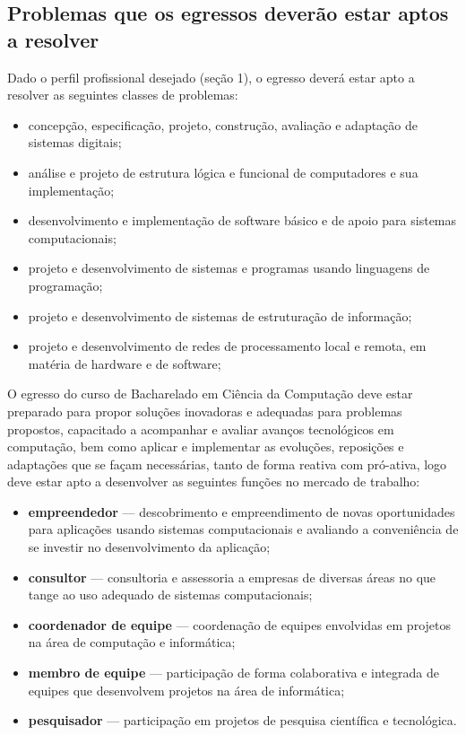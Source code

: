\documentclass[
	12pt,				%
	openright,			%
  oneside,     %
	a4paper,			%
	english,			%
	french,				%
	spanish,			%
	brazil				%
	]{abntex2}
\begin{document}
\subsection{Problemas que os egressos deverão estar aptos a resolver}

Dado o perfil profissional desejado (seção 1), o egresso deverá estar apto a resolver as seguintes classes de problemas: 

\begin{itemize}
  \item concepção, especificação, projeto, construção, avaliação e adaptação de sistemas digitais; 
  \item análise e projeto de estrutura lógica e funcional de computadores e sua
implementação;
  \item desenvolvimento e implementação de software básico e de apoio para
  sistemas computacionais;
  \item projeto e desenvolvimento de sistemas e programas usando linguagens de
  programação;
  \item projeto e desenvolvimento de sistemas de estruturação de informação; 
  \item projeto e desenvolvimento de redes de processamento local e remota, em
  matéria de hardware e de software;
\end{itemize}

O egresso do curso de Bacharelado em Ciência da Computação deve estar
preparado para propor soluções inovadoras e  adequadas para problemas propostos,
capacitado a acompanhar e avaliar avanços  tecnológicos em computação, bem como
aplicar e implementar as evoluções, reposições e adaptações que se façam
necessárias, tanto de forma reativa com pró-ativa, logo deve estar apto a
desenvolver as seguintes funções no mercado de trabalho:

\begin{itemize}
  \item \textbf{empreendedor} --- descobrimento e empreendimento de novas
  oportunidades para aplicações usando sistemas computacionais e avaliando a 
  conveniência de se investir no desenvolvimento da aplicação;
  \item \textbf{consultor} --- consultoria e assessoria a empresas de diversas
  áreas no que tange ao uso adequado de sistemas computacionais;
  \item \textbf{coordenador de equipe} --- coordenação de equipes envolvidas em
  projetos na área de computação e informática;
  \item \textbf{membro de equipe} --- participação de forma colaborativa e 
  integrada de equipes que desenvolvem projetos na área de informática;
  \item \textbf{pesquisador} --- participação em projetos de pesquisa científica
  e tecnológica.
\end{itemize}
\end{document}

